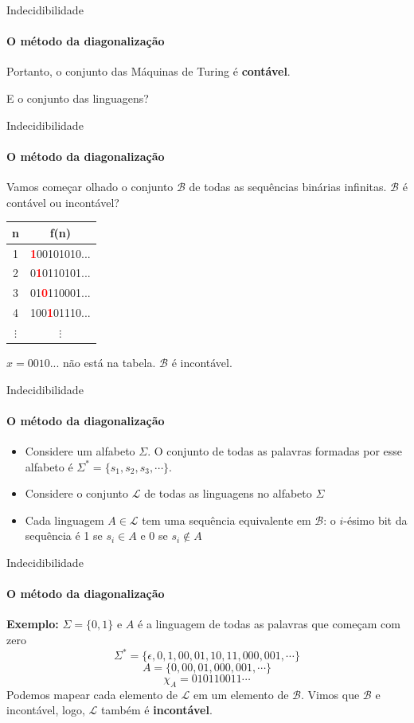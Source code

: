 \documentclass{beamer}
\begin{document}
\begin{frame}{Indecidibilidade}
	\framesubtitle{O método da diagonalização}
	Portanto, o conjunto das Máquinas de Turing é \textbf{contável}.
	
	E o conjunto das linguagens?
\end{frame}
\begin{frame}{Indecidibilidade}
	\framesubtitle{O método da diagonalização}
	Vamos começar olhado o conjunto $\mathscr{B}$ de todas as sequências binárias infinitas. $\mathscr{B}$ 
	é contável ou incontável?\pause
	\begin{table}[!b]
	{\carlitoTLF
		\begin{tabular}{cc}
			\textbf{n} & \textbf{f(n)} \\
			\toprule
			1 & \textcolor{red}{\textbf{1}}00101010... \\
			2 & 0\textcolor{red}{\textbf{1}}0110101... \\
			3 & 01\textcolor{red}{\textbf{0}}110001... \\
			4 & 100\textcolor{red}{\textbf{1}}01110... \\
			$\vdots$ & $\vdots$ \\
			\bottomrule
		\end{tabular}}
	\end{table}
	$x = 0010...$ não está na tabela. $\mathscr{B}$ é incontável.
\end{frame}
\begin{frame}{Indecidibilidade}
	\framesubtitle{O método da diagonalização}
	\begin{itemize}
		\item Considere um alfabeto $\Sigma$. O conjunto de todas as palavras formadas por esse alfabeto é $\Sigma^{*} = \{s_{1}, s_{2}, s_{3},\cdots\}$.
		\item Considere o conjunto $\mathscr{L}$ de todas as linguagens no alfabeto $\Sigma$
		\item Cada linguagem $A \in \mathscr{L}$ tem uma sequência equivalente em $\mathscr{B}$: o $i$-ésimo bit da sequência é 1 se $s_{i} \in A$  e 0 se $s_{i} \notin A$
	\end{itemize}
\end{frame}
\begin{frame}{Indecidibilidade}
	\framesubtitle{O método da diagonalização}
	\textbf{Exemplo:} $\Sigma=\{0,1\}$ e $A$ é a linguagem de todas as palavras que começam com zero
	\begin{equation*}
		\Sigma^{*} = \{\epsilon, 0, 1, 00, 01, 10, 11, 000, 001, \cdots\}
	\end{equation*}
	\begin{equation*}
		A = \{0, 00, 01, 000, 001, \cdots\}
	\end{equation*}
	\begin{equation*}
		\chi_{A} = 0 1 0 1 1 0 0 1 1 \cdots
	\end{equation*}\pause
	Podemos mapear cada elemento de $\mathscr{L}$ em um elemento de $\mathscr{B}$. Vimos que $\mathscr{B}$ 
	e incontável, logo, $\mathscr{L}$ também é \textbf{incontável}.
\end{frame}
\end{document}
